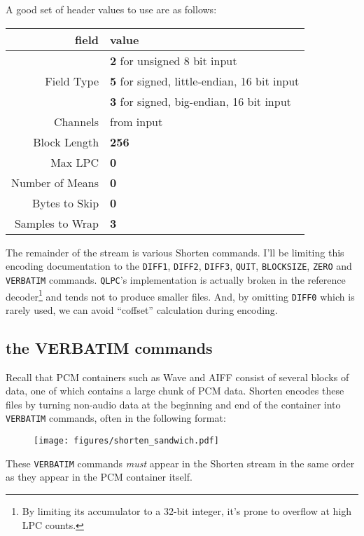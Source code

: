 A good set of header values to use are as follows:
\begin{table}[h]
\begin{tabular}{|r|l|}
\hline
field & value \\
\hline
& \textbf{2} for unsigned 8 bit input \\
Field Type & \textbf{5} for signed, little-endian, 16 bit input \\
& \textbf{3} for signed, big-endian, 16 bit input \\
Channels & from input \\
Block Length & \textbf{256} \\
Max LPC & \textbf{0} \\
Number of Means & \textbf{0} \\
Bytes to Skip & \textbf{0} \\
Samples to Wrap & \textbf{3} \\
\hline
\end{tabular}
\end{table}
\par
\noindent
The remainder of the stream is various Shorten commands.
I'll be limiting this encoding documentation to the \texttt{DIFF1},
\texttt{DIFF2}, \texttt{DIFF3}, \texttt{QUIT}, \texttt{BLOCKSIZE},
\texttt{ZERO} and \texttt{VERBATIM} commands.
\texttt{QLPC}'s implementation is actually broken in the reference
decoder\footnote{By limiting its accumulator to a 32-bit integer,
it's prone to overflow at high LPC counts.} and tends not to
produce smaller files.
And, by omitting \texttt{DIFF0} which is rarely used,
we can avoid ``coffset'' calculation during encoding.

\pagebreak

\subsection{the VERBATIM commands}

Recall that PCM containers such as Wave and AIFF consist of
several blocks of data, one of which contains a large chunk of
PCM data.
Shorten encodes these files by turning non-audio data at
the beginning and end of the container into \texttt{VERBATIM} commands,
often in the following format:
\begin{figure}[h]
\texttt{[image: figures/shorten\_sandwich.pdf]}
\end{figure}
\par
\noindent
These \texttt{VERBATIM} commands \textit{must} appear in
the Shorten stream in the same order as they appear in the
PCM container itself.


